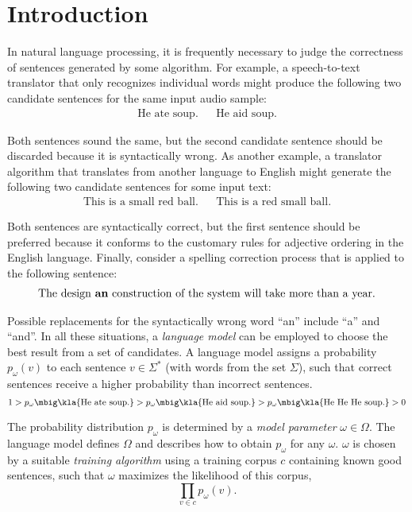 \chapter{Introduction}

In natural language processing, it is frequently necessary to judge the
correctness of sentences generated by some algorithm. For example, a
speech-to-text translator that only recognizes individual words might produce
the following two candidate sentences for the same input audio sample:
\begin{align*}
 \text{He ate soup.} &&
 \text{He aid soup.}
\end{align*}

Both sentences sound the same, but the second candidate sentence should be
discarded because it is syntactically wrong. As another example, a translator
algorithm that translates from another language to English might generate the
following two candidate sentences for some input text:
\begin{align*}
 \text{This is a small red ball.} &&
 \text{This is a red small ball.}
\end{align*}

Both sentences are syntactically correct, but the first sentence should be
preferred because it conforms to the customary rules for adjective ordering in
the English language. Finally, consider a spelling correction process that is
applied to the following sentence: \cite{kukich1992}
\begin{align*}
 \text{The design \textbf{an} construction of the system will take more than a year.}
\end{align*}

Possible replacements for the syntactically wrong word ``an'' include ``a'' and
``and''. In all these situations, a \emph{language model} can be employed to
choose the best result from a set of candidates.
\cite{stolcke2002,youngetal2005} A language model assigns a probability $p_\omega(v)$
to each sentence $v\in\Sigma^*$ (with words from the set $\Sigma$), such that
correct sentences receive a higher probability than incorrect sentences.
\[
 1 > p_\omega\mbig\kla{\text{He ate soup.}} > p_\omega\mbig\kla{\text{He aid soup.}} > p_\omega\mbig\kla{\text{He He He soup.}} > 0
\]

The probability distribution $p_\omega$ is determined by a \emph{model
parameter} $\omega\in\Omega$. The language model defines $\Omega$ and describes
how to obtain $p_\omega$ for any $\omega$. $\omega$ is chosen by a suitable
\emph{training algorithm} using a training corpus $c$ containing known good
sentences, such that $\omega$ maximizes the likelihood of this corpus,
\[
 \prod_{v\in c} p_\omega(v).
\]


